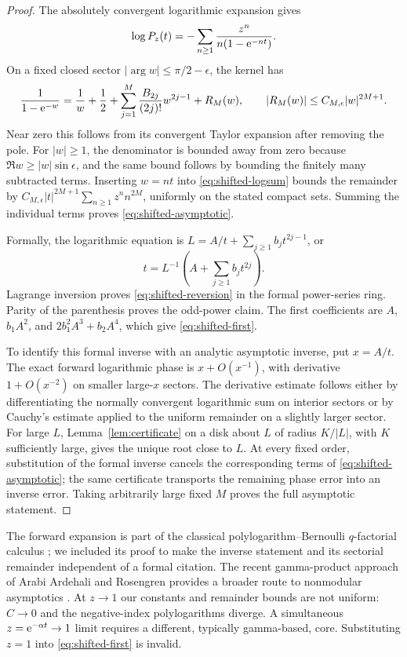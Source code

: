 \documentclass[11pt,a4paper]{article}
\numberwithin{equation}{section}
\theoremstyle{definition}\newtheorem{definition}[theorem]{Definition}
\theoremstyle{remark}\newtheorem{remark}[theorem]{Remark}
\begin{document}
\begin{proof}
The absolutely convergent logarithmic expansion gives
\begin{equation}\label{eq:shifted-logsum}
 \log P_z(t)=-\sum_{n\ge1}\frac{z^n}{n(1-\mathrm e^{-nt})}.
\end{equation}
On a fixed closed sector $|\arg w|\le\pi/2-\epsilon$, the kernel has
\[
 \frac1{1-\mathrm e^{-w}}
 =\frac1w+\frac12+
   \sum_{j=1}^M\frac{B_{2j}}{(2j)!}w^{2j-1}
   +R_M(w),\qquad |R_M(w)|\le C_{M,\epsilon}|w|^{2M+1}.
\]
Near zero this follows from its convergent Taylor expansion after
removing the pole. For $|w|\ge1$, the denominator is bounded away from
zero because $\Re w\ge |w|\sin\epsilon$, and the same bound follows
by bounding the finitely many subtracted terms. Inserting $w=nt$ into
\eqref{eq:shifted-logsum} bounds the remainder by
$C_{M,\epsilon}|t|^{2M+1}\sum_{n\ge1}z^nn^{2M}$, uniformly on the
stated compact sets. Summing the individual terms proves
\eqref{eq:shifted-asymptotic}.

Formally, the logarithmic equation is
$L=A/t+\sum_{j\ge1}b_jt^{2j-1}$, or
\[
 t=L^{-1}\left(A+\sum_{j\ge1}b_jt^{2j}\right).
\]
Lagrange inversion proves \eqref{eq:shifted-reversion} in the formal
power-series ring. Parity of the parenthesis proves the odd-power claim.
The first coefficients are $A$, $b_1A^2$, and
$2b_1^2A^3+b_2A^4$, which give \eqref{eq:shifted-first}.

To identify this formal inverse with an analytic asymptotic inverse,
put $x=A/t$. The exact forward logarithmic phase is
$x+O(x^{-1})$, with derivative $1+O(x^{-2})$ on smaller large-$x$
sectors. The derivative estimate follows either by differentiating the
normally convergent logarithmic sum on interior sectors or by Cauchy's
estimate applied to the uniform remainder on a slightly larger sector.
For large $L$, Lemma~\ref{lem:certificate} on a disk about $L$ of radius
$K/|L|$, with $K$ sufficiently large, gives the unique root close to $L$.
At every fixed order, substitution of the formal inverse cancels the
corresponding terms of \eqref{eq:shifted-asymptotic}; the same certificate
transports the remaining phase error into an inverse error. Taking
arbitrarily large fixed $M$ proves the full asymptotic statement.
\end{proof}

The forward expansion is part of the classical polylogarithm--Bernoulli
$q$-factorial calculus \cite{mcintosh}; we included its proof to make
the inverse statement and its sectorial remainder independent of a
formal citation. The recent gamma-product approach of Arabi Ardehali
and Rosengren provides a broader route to nonmodular asymptotics
\cite{ar}. At $z\to1$ our constants and remainder bounds are not uniform:
$C\to0$ and the negative-index polylogarithms diverge. A simultaneous
$z=\mathrm e^{-\alpha t}\to1$ limit requires a different, typically gamma-based,
core. Substituting $z=1$ into \eqref{eq:shifted-first} is invalid.
\end{document}
